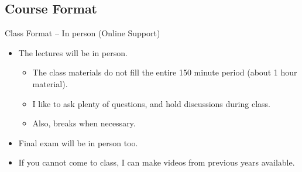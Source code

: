 \documentclass[aspectratio=169]{beamer}
\begin{document}
\subsection{Course Format}
\begin{frame}[t]{Class Format -- In person (Online Support)}
  \begin{itemize}
  \item The lectures will be in person.
    \begin{itemize}
    \item The class materials do not fill the entire 150 minute period (about 1 hour material).
    \item I like to ask plenty of questions, and hold discussions during class.
    \item Also, breaks when necessary.
    \end{itemize}
  \item Final exam will be in person too.
  \item If you cannot come to class, I can make videos from previous years available.
  \end{itemize}
\end{frame}

\end{document}
